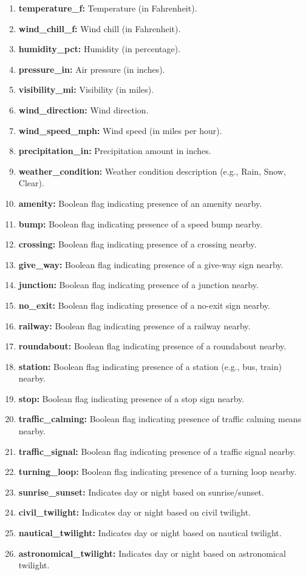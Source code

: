 \documentclass[11pt,a4paper]{article}
\begin{document}
\begin{enumerate}
    \item \textbf{temperature\_f:} Temperature (in Fahrenheit).
    \item \textbf{wind\_chill\_f:} Wind chill (in Fahrenheit).
    \item \textbf{humidity\_pct:} Humidity (in percentage).
    \item \textbf{pressure\_in:} Air pressure (in inches).
    \item \textbf{visibility\_mi:} Visibility (in miles).
    \item \textbf{wind\_direction:} Wind direction.
    \item \textbf{wind\_speed\_mph:} Wind speed (in miles per hour).
    \item \textbf{precipitation\_in:} Precipitation amount in inches.
    \item \textbf{weather\_condition:} Weather condition description (e.g., Rain, Snow, Clear).
    \item \textbf{amenity:} Boolean flag indicating presence of an amenity nearby.
    \item \textbf{bump:} Boolean flag indicating presence of a speed bump nearby.
    \item \textbf{crossing:} Boolean flag indicating presence of a crossing nearby.
    \item \textbf{give\_way:} Boolean flag indicating presence of a give-way sign nearby.
    \item \textbf{junction:} Boolean flag indicating presence of a junction nearby.
    \item \textbf{no\_exit:} Boolean flag indicating presence of a no-exit sign nearby.
    \item \textbf{railway:} Boolean flag indicating presence of a railway nearby.
    \item \textbf{roundabout:} Boolean flag indicating presence of a roundabout nearby.
    \item \textbf{station:} Boolean flag indicating presence of a station (e.g., bus, train) nearby.
    \item \textbf{stop:} Boolean flag indicating presence of a stop sign nearby.
    \item \textbf{traffic\_calming:} Boolean flag indicating presence of traffic calming means nearby.
    \item \textbf{traffic\_signal:} Boolean flag indicating presence of a traffic signal nearby.
    \item \textbf{turning\_loop:} Boolean flag indicating presence of a turning loop nearby.
    \item \textbf{sunrise\_sunset:} Indicates day or night based on sunrise/sunset.
    \item \textbf{civil\_twilight:} Indicates day or night based on civil twilight.
    \item \textbf{nautical\_twilight:} Indicates day or night based on nautical twilight.
    \item \textbf{astronomical\_twilight:} Indicates day or night based on astronomical twilight.
\end{enumerate}
\end{document}
